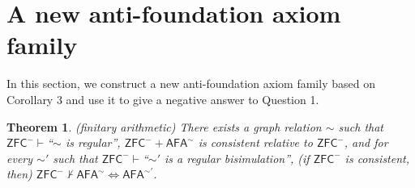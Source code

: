 \documentclass{amsart}
\newcommand{\zfc}{\mathsf{ZFC}}
\newcommand{\afa}{\mathsf{AFA}}
\newtheorem{theorem}{Theorem}
\begin{document}
\fi

\section{A new anti-foundation axiom family}

In this section, we construct a new anti-foundation axiom family based on Corollary 3 and use it to give a negative answer to Question 1.

\begin{theorem}
    (finitary arithmetic) There exists a graph relation $\sim$ such that $\zfc^-\vdash$``$\sim$ is regular'', $\zfc^-+\afa^\sim$ is consistent relative to $\zfc^-$, and for every $\sim'$ such that $\zfc^-\vdash$``$\sim'$ is a regular bisimulation'', (if $\zfc^-$ is consistent, then) $\zfc^-\not\vdash\afa^\sim\Leftrightarrow\afa^{\sim'}$.
\end{theorem}
\end{document}

